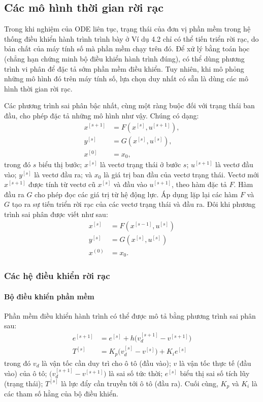 \subsection{Các mô hình thời gian rời rạc}
Trong khi nghiệm của ODE liên tục, trạng thái của đơn vị phần mềm trong hệ thống điều khiển hành trình trình bày ở Ví dụ 4.2 chỉ có thể tiến triển rời rạc, do bản chất của máy tính số mà phần mềm chạy trên đó. Để xử lý bằng toán học (chẳng hạn chứng minh bộ điều khiển hành trình đúng), có thể dùng phương trình vi phân để đặc tả sớm phần mềm điều khiển. Tuy nhiên, khi mô phỏng những mô hình đó trên máy tính số, lựa chọn duy nhất có sẵn là dùng các mô hình thời gian rời rạc.

Các phương trình sai phân bậc nhất, cùng một ràng buộc đối với trạng thái ban đầu, cho phép đặc tả những mô hình như vậy. Chúng có dạng:
\begin{equation}\begin{aligned}
x^{[s+1]}&=F(x^{[s]},u^{[s+1]}),\\y^{[s]}&=G(x^{[s]},u^{[s]}),\\x^{[0]}&=x_0,
\end{aligned}\tag{4.3}\end{equation}
trong đó $s$ biểu thị bước; $x^{[s]}$ là vectơ trạng thái ở bước $s$; $u^{[s+1]}$ là vectơ đầu vào; $y^{[s]}$ là vectơ đầu ra; và $x_0$ là giá trị ban đầu của vectơ trạng thái. Vectơ mới $x^{[s+1]}$ được tính từ vectơ cũ $x^{[s]}$ và đầu vào $u^{[s+1]}$, theo hàm đặc tả $F$. Hàm đầu ra $G$ cho phép đọc các giá trị từ hệ động lực. Áp dụng lặp lại các hàm $F$ và $G$ tạo ra sự tiến triển rời rạc của các vectơ trạng thái và đầu ra. Đôi khi phương trình sai phân được viết như sau:
\[\begin{aligned}x^{[s]}&=F(x^{[s-1]},u^{[s]})\\y^{[s]}&=G(x^{[s]},u^{[s]})\\x^{(0)}&=x_0.\end{aligned}\]

\subsubsection{Các hệ điều khiển rời rạc}
\paragraph{Bộ điều khiển phần mềm}
Phần mềm điều khiển hành trình có thể được mô tả bằng phương trình sai phân sau:
\begin{equation}\begin{aligned}
e^{[s+1]}&=e^{[s]}+h\bigl(v_d^{[s+1]}-v^{[s+1]}\bigr)\\
T^{[s]}&=K_p\bigl(v_d^{[s]}-v^{[s]}\bigr)+K_i e^{[s]}
\end{aligned}\tag{4.4}\end{equation}
trong đó $v_d$ là vận tốc cần duy trì cho ô tô (đầu vào); $v$ là vận tốc thực tế (đầu vào) của ô tô; $\bigl(v_d^{[s+1]}-v^{[s+1]}\bigr)$ là sai số tức thời; $e^{[s]}$ biểu thị sai số tích lũy (trạng thái); $T^{[s]}$ là lực đẩy cần truyền tới ô tô (đầu ra). Cuối cùng, $K_p$ và $K_i$ là các tham số hằng của bộ điều khiển.

